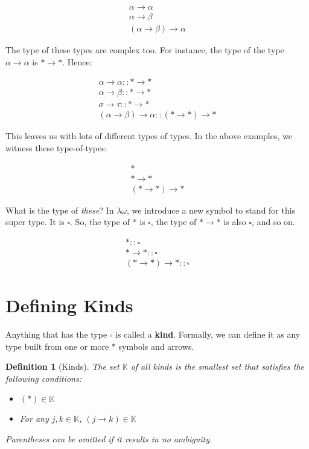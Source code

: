 \documentclass{book}
\numberwithin{equation}{chapter}
\newcommand{\vocab}{\textbf}
\newtheorem{definition}{Definition}
\begin{document}
\begin{align}
\alpha \rightarrow \alpha \\
\alpha \rightarrow \beta \\
(\alpha \rightarrow \beta) \rightarrow \alpha
\end{align}

\noindent
The type of these types are complex too. For instance, the type of the type $\alpha \rightarrow \alpha$ is $\ast \rightarrow \ast$. Hence:

\begin{align}
\alpha \rightarrow \alpha :: \ast \rightarrow \ast \\
\alpha \rightarrow \beta :: \ast \rightarrow \ast \\
\sigma \rightarrow \tau :: \ast \rightarrow \ast \\
(\alpha \rightarrow \beta) \rightarrow \alpha :: (\ast \rightarrow \ast) \rightarrow \ast
\end{align}

\noindent
This leaves us with lots of different types of types. In the above examples, we witness these type-of-types:

\begin{align}
\ast \\
\ast \rightarrow \ast \\
(\ast \rightarrow \ast) \rightarrow \ast
\end{align}

\noindent
What is the type of \textit{these}? In $\lambda\omega$, we introduce a new symbol to stand for this super type. It is $\square$. So, the type of $\ast$ is $\square$, the type of $\ast \rightarrow \ast$ is also $\square$, and so on.

\begin{align}
\ast :: \square \\
\ast \rightarrow \ast :: \square \\
(\ast \rightarrow \ast) \rightarrow \ast :: \square
\end{align}


\section{Defining Kinds}

Anything that has the type $\square$ is called a \vocab{kind}. Formally, we can define it as any type built from one or more $\ast$ symbols and arrows.

\begin{definition}[Kinds]
The set $\mathbb{K}$ of all kinds is the smallest set that satisfies the following conditions:

\begin{itemize}
\item{$(\ast) \in \mathbb{K}$}
\item{For any $j, k \in \mathbb{K}$, $(j \rightarrow k) \in \mathbb{K}$}
\end{itemize}

\noindent
Parentheses can be omitted if it results in no ambiguity.
\end{definition}
\end{document}
